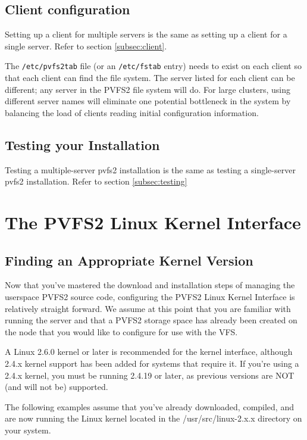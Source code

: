 \documentclass[11pt, letterpaper]{article}
\begin{document}
\subsection{Client configuration}

Setting up a client for multiple servers is the same as setting up a client
for a single server.  Refer to section \ref{subsec:client}.

The \texttt{/etc/pvfs2tab} file (or an \texttt{/etc/fstab} entry) needs to
exist on each client so that each client can find the file system.  The server
listed for each client can be different; any server in the PVFS2 file system
will do.  For large clusters, using different server names will eliminate one
potential bottleneck in the system by balancing the load of clients reading
initial configuration information.

\subsection {Testing your Installation}

Testing a multiple-server pvfs2 installation is the same as testing a
single-server pvfs2 installation.  Refer to section
\ref{subsec:testing}

\section{The PVFS2 Linux Kernel Interface}
\label{sec:kernel-interface}

\subsection{Finding an Appropriate Kernel Version}
\label{sec:kernel-check}

Now that you've mastered the download and installation steps of
managing the userspace PVFS2 source code, configuring the PVFS2 Linux
Kernel Interface is relatively straight forward.  We assume at this
point that you are familiar with running the server and that a PVFS2
storage space has already been created on the node that you would like
to configure for use with the VFS.

A Linux 2.6.0 kernel or later is recommended for the kernel interface,
although 2.4.x kernel support has been added for systems that require
it.  If you're using a 2.4.x kernel, you must be running 2.4.19 or
later, as previous versions are NOT (and will not be) supported.

The following examples assume that you've already downloaded,
compiled, and are now running the Linux kernel located in the
/usr/src/linux-2.x.x directory on your system.
\end{document}
